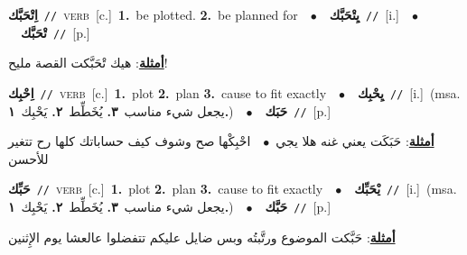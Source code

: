 \documentclass[10pt,a4paper,twoside]{article} %
\begin{document}
\begin{multicols}{2}
{{{{{{{\setlength\topsep{0pt}\textbf{\foreignlanguage{arabic}{اِتْحَبَّك}}\ {\color{gray}\texttt{//}\color{black}}\ \textsc{verb}\ [c.]\ \textbf{1.}~be plotted.  \textbf{2.}~be planned for\ \ $\bullet$\ \ \setlength\topsep{0pt}\textbf{\foreignlanguage{arabic}{يِتْحَبَّك}}\ {\color{gray}\texttt{//}\color{black}}\ [i.]\ \ $\bullet$\ \ \setlength\topsep{0pt}\textbf{\foreignlanguage{arabic}{تْحَبَّك}}\ {\color{gray}\texttt{//}\color{black}}\ [p.]\  \begin{flushright}\color{gray}\foreignlanguage{arabic}{\textbf{\underline{\foreignlanguage{arabic}{أمثلة}}}: هيك تْحَبَّكت القصة مليح!}\end{flushright}\color{black}} \vspace{2mm}

{\setlength\topsep{0pt}\textbf{\foreignlanguage{arabic}{اِحْبِك}}\ {\color{gray}\texttt{//}\color{black}}\ \textsc{verb}\ [c.]\ \textbf{1.}~plot  \textbf{2.}~plan  \textbf{3.}~cause to fit exactly\ \ $\bullet$\ \ \setlength\topsep{0pt}\textbf{\foreignlanguage{arabic}{يِحْبِك}}\ {\color{gray}\texttt{//}\color{black}}\ [i.]\ \color{gray}(msa. \foreignlanguage{arabic}{يجعل شيء مناسب}~\foreignlanguage{arabic}{\textbf{٣.}}  \foreignlanguage{arabic}{يُخَطِّط}~\foreignlanguage{arabic}{\textbf{٢.}}  \foreignlanguage{arabic}{يَحْبِك}~\foreignlanguage{arabic}{\textbf{١.}})\color{black}\ \ $\bullet$\ \ \setlength\topsep{0pt}\textbf{\foreignlanguage{arabic}{حَبَك}}\ {\color{gray}\texttt{//}\color{black}}\ [p.]\  \begin{flushright}\color{gray}\foreignlanguage{arabic}{\textbf{\underline{\foreignlanguage{arabic}{أمثلة}}}: حَبَكَت يعني غنه هلا يجي\ $\bullet$\ \  احْبِكْها صح وشوف كيف حساباتك كلها رح تتغير للأحسن}\end{flushright}\color{black}} \vspace{2mm}

{\setlength\topsep{0pt}\textbf{\foreignlanguage{arabic}{حَبِّك}}\ {\color{gray}\texttt{//}\color{black}}\ \textsc{verb}\ [c.]\ \textbf{1.}~plot  \textbf{2.}~plan  \textbf{3.}~cause to fit exactly\ \ $\bullet$\ \ \setlength\topsep{0pt}\textbf{\foreignlanguage{arabic}{يْحَبِّك}}\ {\color{gray}\texttt{//}\color{black}}\ [i.]\ \color{gray}(msa. \foreignlanguage{arabic}{يجعل شيء مناسب}~\foreignlanguage{arabic}{\textbf{٣.}}  \foreignlanguage{arabic}{يُخَطِّط}~\foreignlanguage{arabic}{\textbf{٢.}}  \foreignlanguage{arabic}{يَحْبِك}~\foreignlanguage{arabic}{\textbf{١.}})\color{black}\ \ $\bullet$\ \ \setlength\topsep{0pt}\textbf{\foreignlanguage{arabic}{حَبَّك}}\ {\color{gray}\texttt{//}\color{black}}\ [p.]\  \begin{flushright}\color{gray}\foreignlanguage{arabic}{\textbf{\underline{\foreignlanguage{arabic}{أمثلة}}}: حَبَّكت الموضوع ورتَّبتُه وبس ضايل عليكم تتفضلوا عالعشا يوم الإِثنين}\end{flushright}\color{black}} \vspace{2mm}

}}}}}}
\end{multicols}
\end{document}
